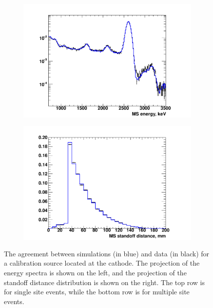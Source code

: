 \documentclass[herrin-thesis.tex]{subfiles}
\begin{document}
\begin{figure}[htbp]
\begin{subfigure}[c]{0.48\textwidth}
	\includegraphics[trim = 1.8cm 0cm 1.5cm 1cm, clip=true, width=\textwidth]{./plots/analysis_shape_agreement_E_ThS5MSlog.pdf}
	\end{subfigure}\hfill%
	\begin{subfigure}[c]{0.48\textwidth}
	\centering
	\includegraphics[trim = 1.8cm 0cm 1.5cm 1cm, clip=true, width=\textwidth]{./plots/analysis_shape_agreement_sd_ThS5MSlin.pdf}
	\end{subfigure}
\caption[Agreement between simulation and data for a  calibration source]{The agreement between simulations (in blue) and data (in black) for a  calibration source located at the cathode. The projection of the energy spectra is shown on the left, and the projection of the standoff distance distribution is shown on the right. The top row is for single site events, while the bottom row is for multiple site events.}
\label{fig:analysis_shape_agreement}
\end{figure}
\end{document}
